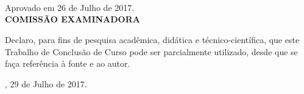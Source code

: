 \documentclass[
	12pt,				%
	openright,			%
	oneside,			%
	a4paper,			%
	english,			%
	french,				%
	spanish,			%
	brazil				%
	]{abntex2}
\begin{document}
\begin{folhadeaprovacao}
  \begin{center}
    {\ABNTEXchapterfont\MakeTextUppercase{\imprimirautor}}\\
    \begin{center}
      \ABNTEXchapterfont\MakeTextUppercase{\imprimirtitulo}\\
    \end{center}
    \hspace{.45\textwidth}
    \begin{minipage}{.5\textwidth}
      {\footnotesize{\imprimirpreambulo}}\\
    \end{minipage}%
  \end{center}
  \vspace{-1cm}%
  \begin{center}
    Aprovado em 26 de Julho de 2017.\\[15mm]
    \textbf{COMISSÃO EXAMINADORA}\\[5mm]
    \vspace{-1cm}
    \vspace{-1cm}
    \vspace{-1cm}
  \end{center}
\end{folhadeaprovacao}

\begin{declaracaodoautor}

  \vspace*{1.5cm}

  Declaro, para fins de pesquisa acadêmica, didática e
  técnico-científica, que este Trabalho de Conclusão de Curso pode ser
  parcialmente utilizado, desde que se faça referência à fonte e ao
  autor.

  \vspace*{2.5cm}

  \centering

  \imprimirlocal, 29 de Julho de 2017.

  \vspace*{2.5cm}

  \imprimirautor

  \vspace*{\fill}
  
\end{declaracaodoautor}
\end{document}
